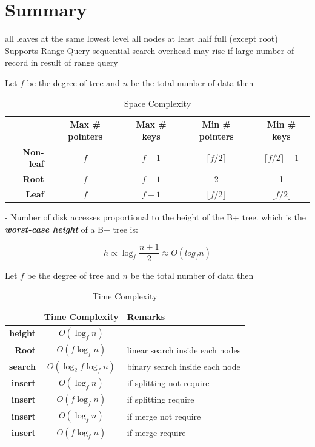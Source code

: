 \documentclass[paper=letter, fontsize=12pt]{article}
\begin{document}
\section{Summary}
\begin{itemize}
	\tick all leaves at the same lowest level
	\tick all nodes at least half full (except root)
	\tick Supports Range Query
	\fail sequential search overhead may rise if large number of record in result of range query
\end{itemize}

\begin{table}[H]
	Let $f$ be the degree of tree and $n$ be the total number of data then
	\centering
	\caption*{Space Complexity}
	\begin{tabular}{r | c | c | c | c}
		& \textbf{Max \# pointers} & \textbf{Max \# keys} & \textbf{Min \# pointers} & \textbf{Min \# keys} \\
		\hline
		\hline
		\textbf{Non-leaf} & $f$ & $f - 1$ & $\lceil f/2 \rceil$ & $\lceil f/2 \rceil - 1$ \\
		\textbf{Root} & $f$ & $f - 1$ & 2 & 1 \\
		\textbf{Leaf} & $f$ & $f - 1$ & $\lfloor f/2 \rfloor$ & $\lfloor f/2 \rfloor$ \\
	\end{tabular}
\end{table}


- Number of disk accesses proportional to the height of the B+ tree.
which is the \textit{\textbf{worst-case height}} of a B+ tree is:

\begin{equation}
	h \propto \log_f\frac{n+1}{2} \approx O(log_fn)
\end{equation}

\begin{table}[H]
	Let $f$ be the degree of tree and $n$ be the total number of data then
	\centering
	\caption*{Time Complexity}
	\begin{tabular}{r | c | l }
		& \textbf{Time Complexity} & \textbf{Remarks} \\
		\hline
		\hline
		\textbf{height} & $O(\log_fn)$ & \\
		\textbf{Root} & $O(f\log_fn)$ & linear search inside each nodes \\
		\textbf{search} & $O(\log_2f\log_fn)$  & binary search inside each node \\
		\textbf{insert} & $O(\log_fn)$ & if splitting not require \\
		\textbf{insert} & $O(f\log_fn)$  & if splitting require \\
		\textbf{insert} &  $O(\log_fn)$  & if merge not require  \\
		\textbf{insert} &  $O(f\log_fn)$  & if merge require \\
	\end{tabular}
\end{table}
\end{document}
